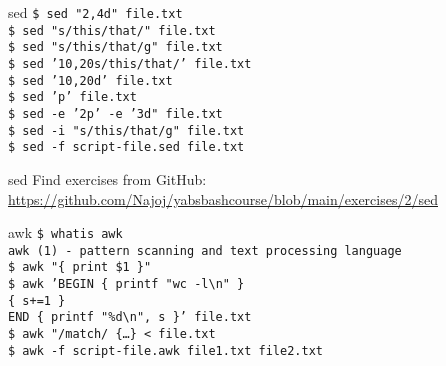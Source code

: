 \documentclass{beamer}
\let\tt\texttt
\begin{document}
\begin{frame}{sed}
        \tt{\$ sed "2,4d"              file.txt}\\
        \tt{\$ sed "s/this/that/"      file.txt}\\  
        \tt{\$ sed "s/this/that/g"     file.txt}\\  
        \tt{\$ sed '10,20s/this/that/' file.txt}\\  
        \tt{\$ sed '10,20d'            file.txt}\\  
        \tt{\$ sed 'p'                 file.txt}\\  
        \tt{\$ sed -e '2p' -e '3d"     file.txt}\\  
        \tt{\$ sed -i "s/this/that/g"  file.txt}\\  
        \tt{\$ sed -f script-file.sed  file.txt}\\  
\end{frame}

\begin{frame}{sed}
        Find exercises from GitHub: \\
        \url{https://github.com/Najoj/yabsbashcourse/blob/main/exercises/2/sed}
\end{frame}

\begin{frame}{awk}
        \tt{\$ whatis awk}\\
        \tt{awk (1)   - pattern scanning and text processing language}\\
        \tt{\$ awk "\{ print \$1 \}" } \\
        \tt{\$ awk 'BEGIN \{ printf "wc -l{\textbackslash}n" \} } \\
        \tt{\quad \quad \{ s+=1 \}} \\
        \tt{\quad END \{ printf "\%d{\textbackslash}n", s \}' file.txt } \\
        \tt{\$ awk "/match/ \{\ldots \} < file.txt } \\
        \tt{\$ awk -f script-file.awk file1.txt file2.txt } \\
\end{frame}
\end{document}
